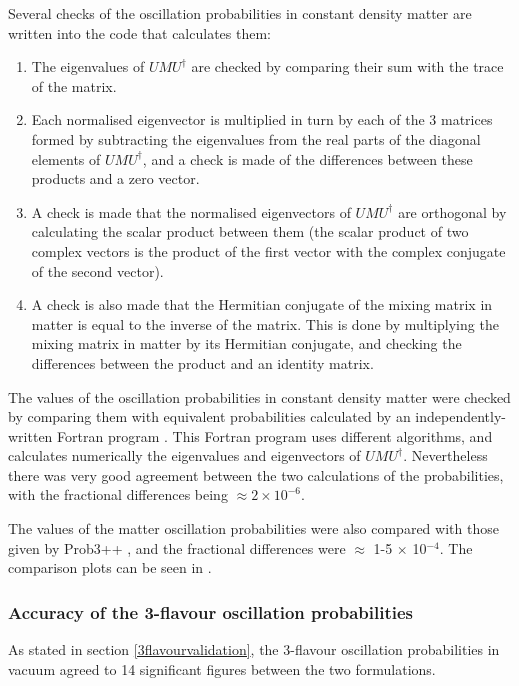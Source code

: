 Several checks of the oscillation probabilities in constant density matter are written into the code that calculates them:
\begin{enumerate}
\item The eigenvalues of $U M U^{\dagger}$ are checked by comparing their sum with the trace of the matrix.
\item Each normalised eigenvector is multiplied in turn by each of the 3 matrices formed by subtracting the eigenvalues from the real parts of the
diagonal elements of $U M U^{\dagger}$, and a check is made of the differences between these products and a zero vector.
\item A check is made that the normalised eigenvectors of $U M U^{\dagger}$ are orthogonal by calculating the scalar product between them (the scalar product of two
complex vectors is the product of the first vector with the complex conjugate of the second vector).
\item A check is also made that the Hermitian conjugate of the mixing matrix in matter is equal to the inverse of the matrix. This is done by multiplying the
mixing matrix in matter by its Hermitian conjugate, and checking the differences between the product and an identity matrix.
\end{enumerate}

The values of the oscillation probabilities in constant density matter were checked by comparing them with equivalent probabilities calculated by an
independently-written Fortran program \cite{sloan}. This Fortran program uses different algorithms, and calculates numerically the eigenvalues and
eigenvectors of $U M U^{\dagger}$. Nevertheless there was very good agreement between the two calculations of the probabilities, with the
fractional differences being $\approx 2 \times 10^{-6}$.

The values of the matter oscillation probabilities were also compared with those given by Prob3++ \cite{Prob3}, and the fractional differences were
$\approx$ 1-5 $\times$ 10$^{-4}$. The comparison plots can be seen in \cite{Compwithprob3}.

%
%
\subsubsection*{Accuracy of the 3-flavour oscillation probabilities}

As stated in section \ref{3flavourvalidation}, the 3-flavour oscillation probabilities in vacuum agreed to 14 significant figures between the two
formulations.

